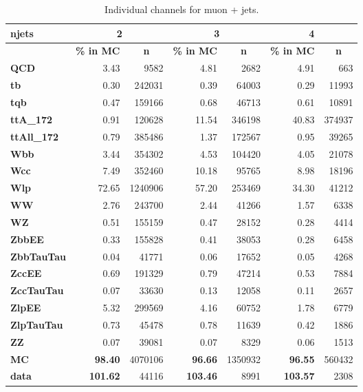 \begin{table}[hb] \footnotesize
\centering
\caption{Individual channels for muon + jets.}
\begin{tabular}{|l|r|r|r|r|r|r|}
\hline
\textbf{njets} & \multicolumn{2}{c|}{\textbf{2}} & \multicolumn{2}{c|}{\textbf{3}} & \multicolumn{2}{c|}{\textbf{4}} \\ \hline
\textbf{} & \multicolumn{1}{l|}{\textbf{\% in MC}} & \multicolumn{1}{c|}{\textbf{n}} & \multicolumn{1}{l|}{\textbf{\% in MC}} & \multicolumn{1}{c|}{\textbf{n}} & \multicolumn{1}{l|}{\textbf{\% in MC}} & \multicolumn{1}{c|}{\textbf{n}} \\ \hline
\textbf{QCD} & 3.43 & 9582 & 4.81 & 2682 & 4.91 & 663 \\ \hline
\textbf{tb} & 0.30 & 242031 & 0.39 & 64003 & 0.29 & 11993 \\ \hline
\textbf{tqb} & 0.47 & 159166 & 0.68 & 46713 & 0.61 & 10891 \\ \hline
\textbf{ttA\_172} & 0.91 & 120628 & 11.54 & 346198 & 40.83 & 374937 \\ \hline
\textbf{ttAll\_172} & 0.79 & 385486 & 1.37 & 172567 & 0.95 & 39265 \\ \hline
\textbf{Wbb} & 3.44 & 354302 & 4.53 & 104420 & 4.05 & 21078 \\ \hline
\textbf{Wcc} & 7.49 & 352460 & 10.18 & 95765 & 8.98 & 18196 \\ \hline
\textbf{Wlp} & 72.65 & 1240906 & 57.20 & 253469 & 34.30 & 41212 \\ \hline
\textbf{WW} & 2.76 & 243700 & 2.44 & 41266 & 1.57 & 6338 \\ \hline
\textbf{WZ} & 0.51 & 155159 & 0.47 & 28152 & 0.28 & 4414 \\ \hline
\textbf{ZbbEE} & 0.33 & 155828 & 0.41 & 38053 & 0.28 & 6458 \\ \hline
\textbf{ZbbTauTau} & 0.04 & 41771 & 0.06 & 17652 & 0.05 & 4268 \\ \hline
\textbf{ZccEE} & 0.69 & 191329 & 0.79 & 47214 & 0.53 & 7884 \\ \hline
\textbf{ZccTauTau} & 0.07 & 33630 & 0.13 & 12058 & 0.11 & 2657 \\ \hline
\textbf{ZlpEE} & 5.32 & 299569 & 4.16 & 60752 & 1.78 & 6779 \\ \hline
\textbf{ZlpTauTau} & 0.73 & 45478 & 0.78 & 11639 & 0.42 & 1886 \\ \hline
\textbf{ZZ} & 0.07 & 39081 & 0.07 & 8329 & 0.06 & 1513 \\ \hline \hline
\textbf{MC} & \textbf{98.40} & 4070106 & \textbf{96.66} & 1350932 & \textbf{96.55} & 560432 \\ \hline
\textbf{data} & \textbf{101.62} & 44116 & \textbf{103.46} & 8991 & \textbf{103.57} & 2308 \\ \hline
\end{tabular}
\label{tab:chnl-muo}
\end{table}
